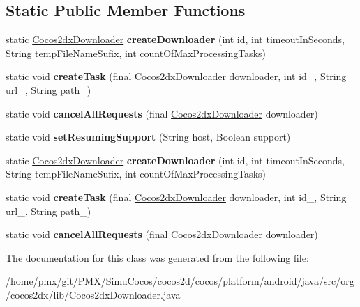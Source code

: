 \subsection*{Static Public Member Functions}
\begin{DoxyCompactItemize}
\item 
\mbox{\label{classorg_1_1cocos2dx_1_1lib_1_1Cocos2dxDownloader_a314326e626d861ab52e202c197d03b1a}} 
static \hyperlink{classorg_1_1cocos2dx_1_1lib_1_1Cocos2dxDownloader}{Cocos2dx\+Downloader} {\bfseries create\+Downloader} (int id, int timeout\+In\+Seconds, String temp\+File\+Name\+Sufix, int count\+Of\+Max\+Processing\+Tasks)
\item 
\mbox{\label{classorg_1_1cocos2dx_1_1lib_1_1Cocos2dxDownloader_a9d79098222f4fc427d4b49cdaae95418}} 
static void {\bfseries create\+Task} (final \hyperlink{classorg_1_1cocos2dx_1_1lib_1_1Cocos2dxDownloader}{Cocos2dx\+Downloader} downloader, int id\+\_\+, String url\+\_\+, String path\+\_\+)
\item 
\mbox{\label{classorg_1_1cocos2dx_1_1lib_1_1Cocos2dxDownloader_a576acfb709cba5a8f4c3e380e859122e}} 
static void {\bfseries cancel\+All\+Requests} (final \hyperlink{classorg_1_1cocos2dx_1_1lib_1_1Cocos2dxDownloader}{Cocos2dx\+Downloader} downloader)
\item 
\mbox{\label{classorg_1_1cocos2dx_1_1lib_1_1Cocos2dxDownloader_ae07715c14af165414c77a901ffa5f569}} 
static void {\bfseries set\+Resuming\+Support} (String host, Boolean support)
\item 
\mbox{\label{classorg_1_1cocos2dx_1_1lib_1_1Cocos2dxDownloader_a314326e626d861ab52e202c197d03b1a}} 
static \hyperlink{classorg_1_1cocos2dx_1_1lib_1_1Cocos2dxDownloader}{Cocos2dx\+Downloader} {\bfseries create\+Downloader} (int id, int timeout\+In\+Seconds, String temp\+File\+Name\+Sufix, int count\+Of\+Max\+Processing\+Tasks)
\item 
\mbox{\label{classorg_1_1cocos2dx_1_1lib_1_1Cocos2dxDownloader_a9d79098222f4fc427d4b49cdaae95418}} 
static void {\bfseries create\+Task} (final \hyperlink{classorg_1_1cocos2dx_1_1lib_1_1Cocos2dxDownloader}{Cocos2dx\+Downloader} downloader, int id\+\_\+, String url\+\_\+, String path\+\_\+)
\item 
\mbox{\label{classorg_1_1cocos2dx_1_1lib_1_1Cocos2dxDownloader_a576acfb709cba5a8f4c3e380e859122e}} 
static void {\bfseries cancel\+All\+Requests} (final \hyperlink{classorg_1_1cocos2dx_1_1lib_1_1Cocos2dxDownloader}{Cocos2dx\+Downloader} downloader)
\end{DoxyCompactItemize}


The documentation for this class was generated from the following file\+:\begin{DoxyCompactItemize}
\item 
/home/pmx/git/\+P\+M\+X/\+Simu\+Cocos/cocos2d/cocos/platform/android/java/src/org/cocos2dx/lib/Cocos2dx\+Downloader.\+java\end{DoxyCompactItemize}
